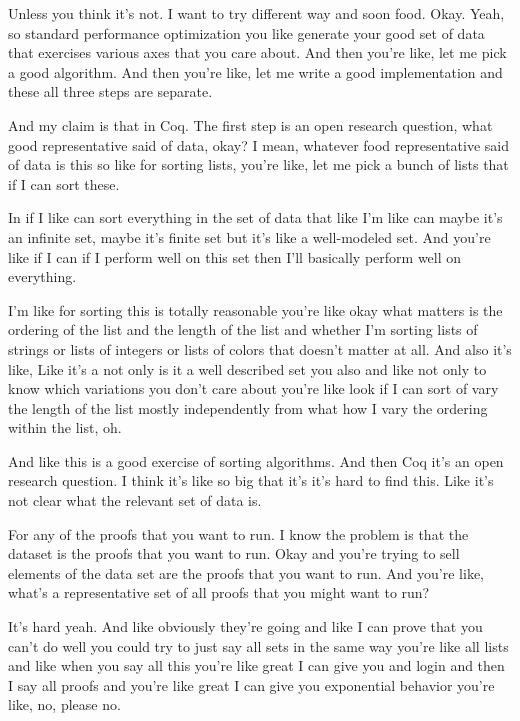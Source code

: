 \begin{subappendices}
    Unless you think it's not. I want to try different way and soon food. Okay. Yeah, so standard performance optimization you like generate your good set of data that exercises various axes that you care about. And then you're like, let me pick a good algorithm. And then you're like, let me write a good implementation and these all three steps are separate. 
    
    And my claim is that in Coq. The first step is an open research question, what good representative said of data, okay? I mean, whatever food representative said of data is this so like for sorting lists, you're like, let me pick a bunch of lists that if I can sort these. 
    
    In if I like can sort everything in the set of data that like I'm like can maybe it's an infinite set, maybe it's finite set but it's like a well-modeled set. And you're like if I can if I perform well on this set then I'll basically perform well on everything. 
    
    I'm like for sorting this is totally reasonable you're like okay what matters is the ordering of the list and the length of the list and whether I'm sorting lists of strings or lists of integers or lists of colors that doesn't matter at all. And also it's like, Like it's a not only is it a well described set you also and like not only to know which variations you don't care about you're like look if I can sort of vary the length of the list mostly independently from what how I vary the ordering within the list, oh. 
    
    And like this is a good exercise of sorting algorithms. And then Coq it's an open research question. I think it's like so big that it's it's hard to find this. Like it's not clear what the relevant set of data is. 
    
    For any of the proofs that you want to run. I know the problem is that the dataset is the proofs that you want to run. Okay and you're trying to sell elements of the data set are the proofs that you want to run. And you're like, what's a representative set of all proofs that you might want to run? 
    
    It's hard yeah. And like obviously they're going and like I can prove that you can't do well you could try to just say all sets in the same way you're like all lists and like when you say all this you're like great I can give you and login and then I say all proofs and you're like great I can give you exponential behavior you're like, no, please no. 
    

\end{subappendices}
